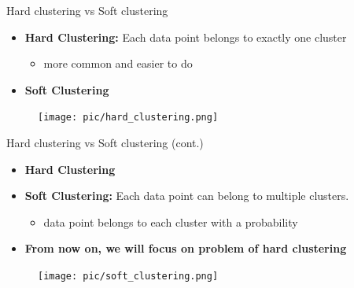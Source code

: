 \documentclass[serif, aspectratio=169]{beamer}
\begin{document}
\begin{frame}{Hard clustering vs Soft clustering}
    \begin{minipage}{0.55\textwidth}
        \begin{itemize}
        \item \textbf{Hard Clustering:} Each data point belongs to exactly one cluster
        \begin{itemize}
            \item more common and easier to do
        \end{itemize}
        \item \textbf{Soft Clustering}
    \end{itemize}
    \end{minipage}%
    \begin{minipage}{0.40\textwidth}
        \begin{figure}
            \centering
            \texttt{[image: pic/hard\_clustering.png]}
        \end{figure}
    \end{minipage}
\end{frame}

\begin{frame}{Hard clustering vs Soft clustering (cont.)}
    \begin{minipage}{0.55\textwidth}
        \begin{itemize}
        \item \textbf{Hard Clustering}
        \item \textbf{Soft Clustering:} Each data point can belong to multiple clusters.
        \begin{itemize}
            \item data point belongs to each cluster with a probability
        \end{itemize}
        \item \textbf{From now on, we will focus on problem of hard clustering}
    \end{itemize}
    \end{minipage}%
    \begin{minipage}{0.40\textwidth}
        \begin{figure}
            \centering
            \texttt{[image: pic/soft\_clustering.png]}
        \end{figure}
    \end{minipage}
\end{frame}
\end{document}
